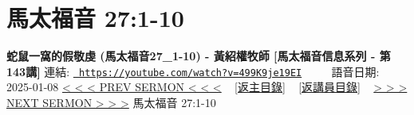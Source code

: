 \documentclass{book}
\begin{document}
\section{馬太福音 27:1-10}
\label{sec:499K9je19EI}
\textbf{蛇鼠一窩的假敬虔 (馬太福音27\_1-10) -  黃紹權牧師 [馬太福音信息系列 - 第143講]}
\newline
\newline
連結: \href{https://youtube.com/watch?v=499K9je19EI}{\texttt{ https://youtube.com/watch?v=499K9je19EI}} ~~~~ 語音日期: 2025-01-08 
\newline
\newline
\hyperref[sec:2sEF8L92TnY]{< < < PREV SERMON < < <}
~
\hyperlink{toc}{[返主目錄]}
~
\hyperref[ch:preacher15]{[返講員目錄]}
~
\hyperref[sec:ZN4O4BAmHMA]{> > > NEXT SERMON > > >}
\newline
\newline
馬太福音 27:1-10
\newline
\end{document}
